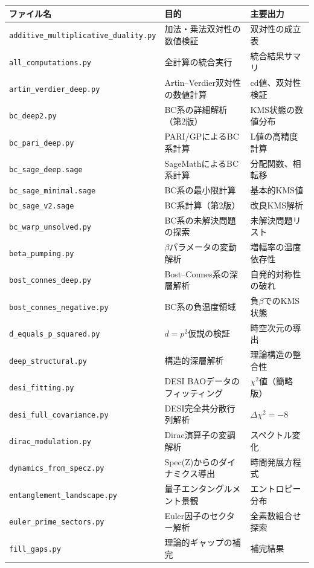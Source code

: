 \begin{longtable}{@{}p{5.5cm}p{5cm}p{4cm}@{}}
\toprule
\textbf{ファイル名} & \textbf{目的} & \textbf{主要出力} \\
\midrule
\endhead
\texttt{additive\_multiplicative\allowbreak \_duality.py} & 加法・乗法双対性の数値検証 & 双対性の成立表 \\
\texttt{all\_computations.py} & 全計算の統合実行 & 統合結果サマリ \\
\texttt{artin\_verdier\_deep.py} & Artin--Verdier双対性の数値計算 & cd値、双対性検証 \\
\texttt{bc\_deep2.py} & BC系の詳細解析（第2版） & KMS状態の数値分布 \\
\texttt{bc\_pari\_deep.py} & PARI/GPによるBC系計算 & L値の高精度計算 \\
\texttt{bc\_sage\_deep.sage} & SageMathによるBC系計算 & 分配関数、相転移 \\
\texttt{bc\_sage\_minimal.sage} & BC系の最小限計算 & 基本的KMS値 \\
\texttt{bc\_sage\_v2.sage} & BC系計算（第2版） & 改良KMS解析 \\
\texttt{bc\_warp\_unsolved.py} & BC系の未解決問題の探索 & 未解決問題リスト \\
\texttt{beta\_pumping.py} & $\beta$パラメータの変動解析 & 増幅率の温度依存性 \\
\texttt{bost\_connes\_deep.py} & Bost--Connes系の深層解析 & 自発的対称性の破れ \\
\texttt{bost\_connes\_negative.py} & BC系の負温度領域 & 負$\beta$でのKMS状態 \\
\texttt{d\_equals\_p\_squared.py} & $d = p^2$仮説の検証 & 時空次元の導出 \\
\texttt{deep\_structural.py} & 構造的深層解析 & 理論構造の整合性 \\
\texttt{desi\_fitting.py} & DESI BAOデータのフィッティング & $\chi^2$値（簡略版） \\
\texttt{desi\_full\_covariance.py} & DESI完全共分散行列解析 & $\Delta\chi^2 = -8$ \\
\texttt{dirac\_modulation.py} & Dirac演算子の変調解析 & スペクトル変化 \\
\texttt{dynamics\_from\_specz.py} & Spec(Z)からのダイナミクス導出 & 時間発展方程式 \\
\texttt{entanglement\_landscape.py} & 量子エンタングルメント景観 & エントロピー分布 \\
\texttt{euler\_prime\_sectors.py} & Euler因子のセクター解析 & 全素数組合せ探索 \\
\texttt{fill\_gaps.py} & 理論的ギャップの補完 & 補完結果 \\

\end{longtable}

